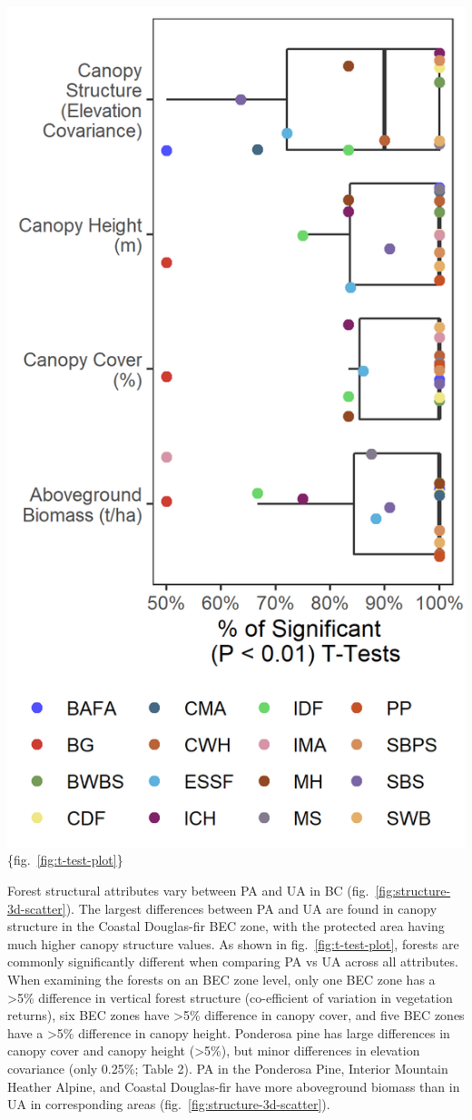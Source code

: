 \documentclass[11pt]{article}
\makeatletter
\def\maxwidth{\ifdim\Gin@nat@width>\linewidth\linewidth
\else\Gin@nat@width\fi}
\let\Oldincludegraphics\includegraphics
\renewcommand{\includegraphics}[1]{\Oldincludegraphics[width=\maxwidth]{#1}}
\makeatother
\begin{document}
\includegraphics{figures/t_tests_scatter.png}\{fig.~\ref{fig:t-test-plot}\}

Forest structural attributes vary between PA and UA in BC
(fig.~\ref{fig:structure-3d-scatter}). The largest differences between
PA and UA are found in canopy structure in the Coastal Douglas-fir BEC
zone, with the protected area having much higher canopy structure
values. As shown in fig.~\ref{fig:t-test-plot}, forests are commonly
significantly different when comparing PA vs UA across all attributes.
When examining the forests on an BEC zone level, only one BEC zone has a
\textgreater5\% difference in vertical forest structure (co-efficient of
variation in vegetation returns), six BEC zones have \textgreater5\%
difference in canopy cover, and five BEC zones have a \textgreater5\%
difference in canopy height. Ponderosa pine has large differences in
canopy cover and canopy height (\textgreater5\%), but minor differences
in elevation covariance (only 0.25\%; Table 2). PA in the Ponderosa
Pine, Interior Mountain Heather Alpine, and Coastal Douglas-fir have
more aboveground biomass than in UA in corresponding areas
(fig.~\ref{fig:structure-3d-scatter}).
\end{document}
